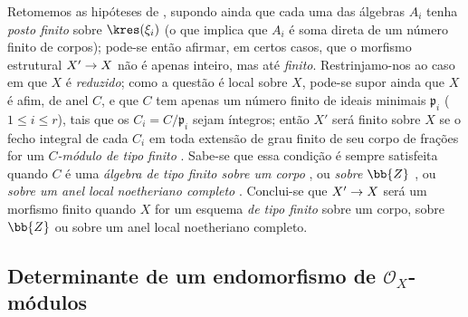 \documentclass[oneside,10pt]{amsart}
\makeatletter
\renewcommand{\leq}{\leqslant}
\newcommand{\ega@arrow}[2]{\mathchoice{#1}{#2}{#2}{#2}}
\renewcommand{\to}{\ega@arrow{\longrightarrow}{\rightarrow}}
\let\EGAOriginalLabel\label
\renewcommand{\label}[1]{\phantomsection\EGAOriginalLabel{#1}}
\makeatother
\begin{document}
\begin{remark}[6.3.10]
\label{II.6.3.10}
Retomemos as hipóteses de , supondo ainda que cada uma das álgebras $A_i$ tenha \emph{posto finito} sobre $\kres(\xi_i)$ (o que implica que $A_i$ é soma direta de um número finito de corpos);
pode-se então afirmar, em certos casos, que o morfismo estrutural $X'\to X$ não é apenas inteiro, mas até \emph{finito}.
Restrinjamo-nos ao caso em que $X$ é \emph{reduzido};
como a questão é local sobre $X$, pode-se supor ainda que $X$ é afim, de anel $C$, e que $C$ tem apenas um número finito de ideais minimais $\mathfrak{p}_i$ ($1\leq i\leq r$), tais que os $C_i=C/\mathfrak{p}_i$ sejam íntegros;
então $X'$ será finito sobre $X$ se o fecho integral de cada $C_i$ em toda extensão de grau finito de seu corpo de frações for um \emph{$C$-módulo de tipo finito} .
Sabe-se que essa condição é sempre satisfeita quando $C$ é uma \emph{álgebra de tipo finito sobre um corpo} \cite[t.~I, p.~267, th.~9]{I-13}, ou \emph{sobre $\bb{Z}$} \cite[I,p.~93, th.~3]{I-9}, ou \emph{sobre um anel local noetheriano completo} \cite[p.~298]{II-25}.
Conclui-se que $X'\to X$ será um morfismo finito quando $X$ for um esquema \emph{de tipo finito} sobre um corpo, sobre $\bb{Z}$ ou sobre um anel local noetheriano completo.
\end{remark}

\subsection{Determinante de um endomorfismo de $\mathcal{O}_X$-módulos}
\label{subsection:II.6.4}
\end{document}
